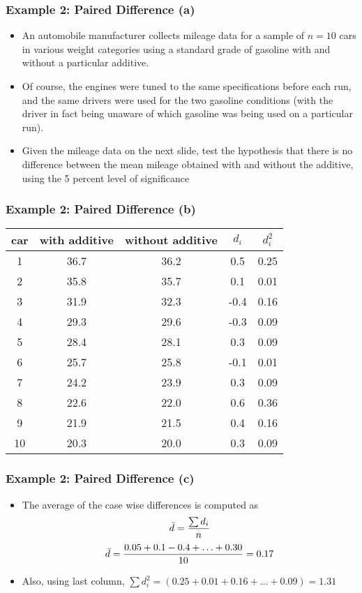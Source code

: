 \documentclass[a4]{beamer}
\begin{document}
\begin{frame}
\frametitle{Example 2: Paired Difference (a)}
\begin{itemize}
\item An automobile manufacturer collects mileage data for a sample of $n = 10$ cars in various weight categories
using a standard grade of gasoline with and without a particular additive. \item Of course, the engines were tuned to the same
specifications before each run, and the same drivers were used for the two gasoline conditions (with the driver in fact being
unaware of which gasoline was being used on a particular run). \item Given the mileage data on the next slide,  test the hypothesis
that there is no difference between the mean mileage obtained with and without the additive, using the 5 percent level of
significance \end{itemize}
\end{frame}
\begin{frame}
\frametitle{Example 2: Paired Difference (b)}
\small
\begin{center}
\begin{tabular}{|c|c|c|c|c|}\hline
car & with additive & without additive & $d_i$ & $d^2_i$\\\hline
1&36.7&36.2&0.5&0.25\\\hline
2&35.8&35.7&0.1&0.01\\\hline
3&31.9&32.3&-0.4&0.16\\\hline
4&29.3&29.6&-0.3&0.09\\\hline
5&28.4&28.1&0.3&0.09\\\hline
6&25.7&25.8&-0.1&0.01\\\hline
7&24.2&23.9&0.3&0.09\\\hline
8&22.6&22.0&0.6&0.36\\\hline
9&21.9&21.5&0.4&0.16\\\hline
10&20.3&20.0&0.3&0.09\\\hline
\end{tabular}
\end{center}
\end{frame}

\begin{frame}
\frametitle{Example 2: Paired Difference (c)}
\begin{itemize}
\item The average of the case wise differences is computed as \[\bar{d} = {\sum d_i \over n}\]
\[ \bar{d} = { 0.05 + 0.1  - 0.4 + \ldots + 0.30 \over 10 }= 0.17 \]
\item Also, using last column, $\sum d^2_i = (0.25 + 0.01 + 0.16 + \ldots + 0.09) = 1.31$
\end{itemize}

\end{frame}
\end{document}
